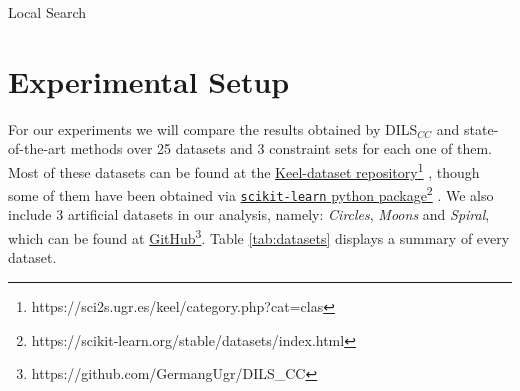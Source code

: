 \documentclass[review]{elsarticle}
\begin{document}
\begin{algorithm}
	\SetNlSkip{0.5em}
	\BlankLine
	\BlankLine
	
	\caption{Local Search}\label{alg:LS}
\end{algorithm}

\clearpage

\section{Experimental Setup} \label{sec:expSetup}

For our experiments we will compare the results obtained by DILS$_{CC}$ and state-of-the-art methods over 25 datasets and 3 constraint sets for each one of them. Most of these datasets can be found at the \href{https://sci2s.ugr.es/keel/category.php?cat=clas}{Keel-dataset repository}\footnote{https://sci2s.ugr.es/keel/category.php?cat=clas} \cite{triguero2017keel}, though some of them have been obtained via
\href{https://scikit-learn.org/stable/datasets/index.html}{\texttt{scikit-learn} python package}\footnote{https://scikit-learn.org/stable/datasets/index.html} \cite{scikit-learn}. We also include 3 artificial datasets in our analysis, namely: \textit{Circles}, \textit{Moons} and \textit{Spiral}, which can be found at \href{https://github.com/GermangUgr/DILS_CC}{GitHub}\footnote{https://github.com/GermangUgr/DILS\_CC}. Table \ref{tab:datasets} displays a summary of every dataset.
\end{document}
